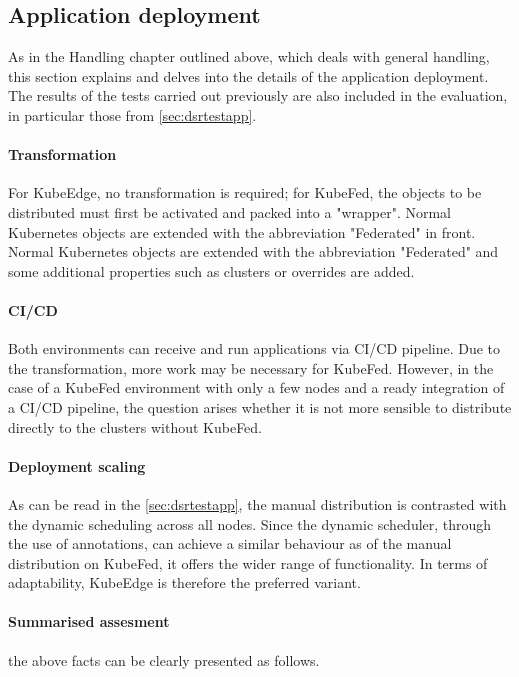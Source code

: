\documentclass[MIC,Master,english]{twbook}%
\begin{document}
\subsection{Application deployment}
As in the Handling chapter outlined above, which deals with general handling, this section explains and delves into the details of the application deployment. The results of the tests carried out previously are also included in the evaluation, in particular those from \autoref{sec:dsrtestapp}.

\paragraph{Transformation} For KubeEdge, no transformation is required; for KubeFed, the objects to be distributed must first be activated and packed into a "wrapper". Normal Kubernetes objects are extended with the abbreviation "Federated" in front. Normal Kubernetes objects are extended with the abbreviation "Federated" and some additional properties such as clusters or overrides are added.

\paragraph{CI/CD} Both environments can receive and run applications via \ac{CI/CD} pipeline. Due to the transformation, more work may be necessary for KubeFed. However, in the case of a KubeFed environment with only a few nodes and a ready integration of a CI/CD pipeline, the question arises whether it is not more sensible to distribute directly to the clusters without KubeFed.

\paragraph{Deployment scaling} As can be read in the \autoref{sec:dsrtestapp}, the manual distribution is contrasted with the dynamic scheduling across all nodes. Since the dynamic scheduler, through the use of annotations, can achieve a similar behaviour as of the manual distribution on KubeFed, it offers the wider range of functionality. In terms of adaptability, KubeEdge is therefore the preferred variant.

\paragraph{Summarised assesment} the above facts can be clearly presented as follows.
\end{document}
